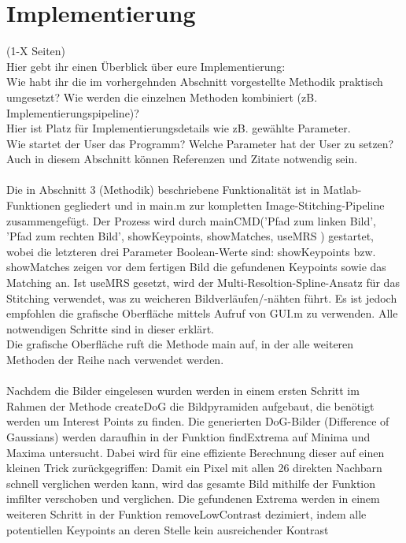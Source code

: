 \documentclass[deutsch]{scrartcl}
\begin{document}
\section{Implementierung}
(1-X Seiten)\\
Hier gebt ihr einen Überblick über eure Implementierung:\\
Wie habt ihr die im vorhergehnden Abschnitt vorgestellte Methodik praktisch umgesetzt? Wie werden die einzelnen Methoden kombiniert (zB. Implementierungspipeline)?\\
Hier ist Platz für Implementierungsdetails wie zB. gewählte Parameter. \\
Wie startet der User das Programm? Welche Parameter hat der User zu setzen?\\
Auch in diesem Abschnitt können Referenzen und Zitate notwendig sein.\\\\
Die in Abschnitt 3 (Methodik) beschriebene Funktionalität ist in
Matlab-Funktionen gegliedert und in main.m zur kompletten
Image-Stitching-Pipeline zusammengefügt. Der Prozess wird durch mainCMD('Pfad
zum linken Bild', 'Pfad zum rechten Bild', showKeypoints, showMatches, useMRS ) gestartet, wobei die letzteren drei Parameter Boolean-Werte sind: showKeypoints bzw. showMatches zeigen vor dem fertigen Bild die gefundenen Keypoints sowie das Matching an. Ist useMRS gesetzt, wird der Multi-Resoltion-Spline-Ansatz für das Stitching verwendet, was zu weicheren Bildverläufen/-nähten führt.
Es ist jedoch empfohlen die grafische Oberfläche mittels Aufruf
von GUI.m zu verwenden. Alle notwendigen Schritte sind in dieser erklärt.\\
Die grafische Oberfläche ruft die Methode main auf, in der alle weiteren
Methoden der Reihe nach verwendet werden. \\\\
Nachdem die Bilder eingelesen wurden werden in einem ersten Schritt im Rahmen
der Methode createDoG die Bildpyramiden aufgebaut, die benötigt werden um
Interest Points zu finden. Die generierten DoG-Bilder (Difference of
Gaussians) werden daraufhin in der Funktion findExtrema auf Minima und
Maxima untersucht. Dabei wird für eine effiziente Berechnung dieser auf
einen kleinen Trick zurückgegriffen: Damit ein Pixel mit allen 26 direkten
Nachbarn schnell verglichen werden kann, wird das gesamte Bild mithilfe der
Funktion imfilter verschoben und verglichen. Die gefundenen Extrema werden
in einem weiteren Schritt in der Funktion removeLowContrast dezimiert, indem
alle potentiellen Keypoints an deren Stelle kein ausreichender Kontrast
\end{document}
